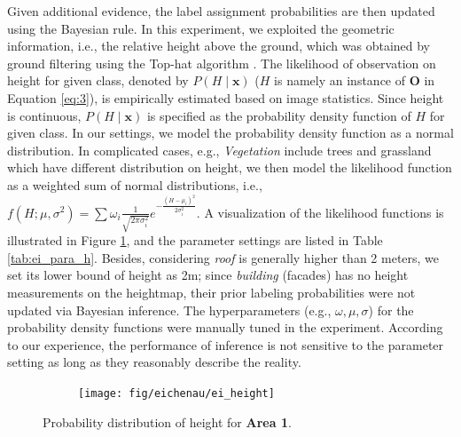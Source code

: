 Given additional evidence, the label assignment probabilities are then updated using the Bayesian rule. In this experiment, we exploited the geometric information, i.e., the relative height above the ground, which was obtained by ground filtering using the Top-hat algorithm \cite{Mongus2012tophat}. The likelihood of observation on height for given class, denoted by $P\left(H \mid \mathbf{x}\right)$ ($H$ is namely an instance of $\mathbf{O}$ in Equation \ref{eq:3}), is empirically estimated based on image statistics. Since height is continuous, $P\left(H \mid \mathbf{x}\right)$ is specified as the probability density function of $H$ for given class. In our settings, we model the probability density function as a normal distribution. In complicated cases, e.g., \textit{Vegetation} include trees and grassland which have different distribution on height, we then model the likelihood function as a weighted sum of normal distributions, i.e., $f(H;\mu ,\sigma ^{2}) = \sum \omega_i\frac {1}{\sqrt {2\pi \sigma_i ^{2}}}e^{-\frac {(H-\mu_i )^{2}}{2\sigma_i ^{2}}}$. A visualization of the likelihood functions is illustrated in Figure \ref{fig:ei_distrib}, and the parameter settings are listed in Table \ref{tab:ei_para_h}. Besides, considering \textit{roof} is generally higher than 2 meters, we set its lower bound of height as 2m; since \textit{building} (facades) has no height measurements on the heightmap, their prior labeling probabilities were not updated via Bayesian inference. The hyperparameters (e.g., $\omega, \mu ,\sigma$) for the probability density functions were manually tuned in the experiment. According to our experience, the performance of inference is not sensitive to the parameter setting as long as they reasonably describe the reality.  

\begin{figure}[htb]
    \centering
       \begin{subfigure}{0.95\columnwidth}
	       \centering
           \texttt{[image: fig/eichenau/ei\_height]}	
       \end{subfigure}      
       \caption{Probability distribution of height for \textbf{Area 1}.}
       \label{fig:ei_distrib}
\end{figure}

